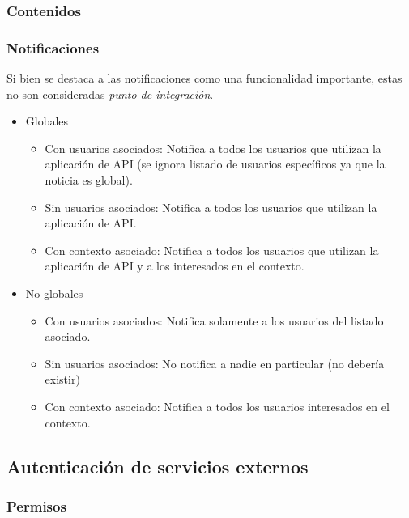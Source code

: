 \subsubsection{Contenidos}
\label{funcionalidad_contenidos}


\subsubsection{Notificaciones}
\label{funcionalidad_notificaciones}

Si bien se destaca a las notificaciones como una funcionalidad importante, estas no son consideradas \textit{punto de integración}.

\begin{itemize}
\item Globales
\begin{itemize}
\item Con usuarios asociados: Notifica a todos los usuarios que utilizan la aplicación de API (se ignora listado de usuarios específicos ya que la noticia es global).
\item Sin usuarios asociados: Notifica a todos los usuarios que utilizan la aplicación de API.
\item Con contexto asociado: Notifica a todos los usuarios que utilizan la aplicación de API y a los interesados en el contexto.
\end{itemize}
\item No globales
\begin{itemize}
\item Con usuarios asociados: Notifica solamente a los usuarios del listado asociado.
\item Sin usuarios asociados: No notifica a nadie en particular (no debería existir)
\item Con contexto asociado: Notifica a todos los usuarios interesados en el contexto.
\end{itemize}
\end{itemize}

\subsection{Autenticación de servicios externos}
\label{autenticacion_servicios_externos}

\subsubsection{Permisos}
\label{autenticacion_permisos}